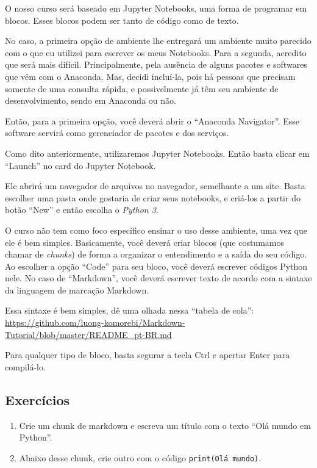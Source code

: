 \documentclass[11pt, brazilian]{article}
\providecommand{\tightlist}{%
      \setlength{\itemsep}{0pt}\setlength{\parskip}{0pt}}
\begin{document}
O nosso curso será baseado em Jupyter Notebooks, uma forma de programar
em blocos. Esses blocos podem ser tanto de código como de texto.

No caso, a primeira opção de ambiente lhe entregará um ambiente muito
parecido com o que eu utilizei para escrever os meus Notebooks. Para a
segunda, acredito que será mais difícil. Principalmente, pela ausência
de alguns pacotes e softwares que vêm com o Anaconda. Mas, decidi
incluí-la, pois há pessoas que precisam somente de uma consulta rápida,
e possivelmente já têm seu ambiente de desenvolvimento, sendo em
Anaconda ou não.

Então, para a primeira opção, você deverá abrir o ``Anaconda
Navigator''. Esse software servirá como gerenciador de pacotes e dos
serviços.

Como dito anteriormente, utilizaremos Jupyter Notebooks. Então basta
clicar em ``Launch'' no card do Jupyter Notebook.

Ele abrirá um navegador de arquivos no navegador, semelhante a um site.
Basta escolher uma pasta onde gostaria de criar seus notebooks, e
criá-los a partir do botão ``New'' e então escolha o \emph{Python 3}.

O curso não tem como foco específico ensinar o uso desse ambiente, uma
vez que ele é bem simples. Basicamente, você deverá criar blocos (que
costumamos chamar de \emph{chunks}) de forma a organizar o entendimento
e a saída do seu código. Ao escolher a opção ``Code'' para seu bloco,
você deverá escrever códigos Python nele. No caso de ``Markdown'', você
deverá escrever texto de acordo com a sintaxe da linguagem de marcação
Markdown.

Essa sintaxe é bem simples, dê uma olhada nessa ``tabela de cola'':
\url{https://github.com/luong-komorebi/Markdown-Tutorial/blob/master/README_pt-BR.md}

Para qualquer tipo de bloco, basta segurar a tecla Ctrl e apertar Enter
para compilá-lo.

    \hypertarget{exercuxedcios}{%
\subsection{Exercícios}\label{exercuxedcios}}

\begin{enumerate}
\def\labelenumi{\arabic{enumi}.}
\tightlist
\item
  Crie um chunk de markdown e escreva um título com o texto ``Olá mundo
  em Python''.
\item
  Abaixo desse chunk, crie outro com o código
  \texttt{print(\textquotesingle{}Olá\ mundo\textquotesingle{})}.
\end{enumerate}
\end{document}
